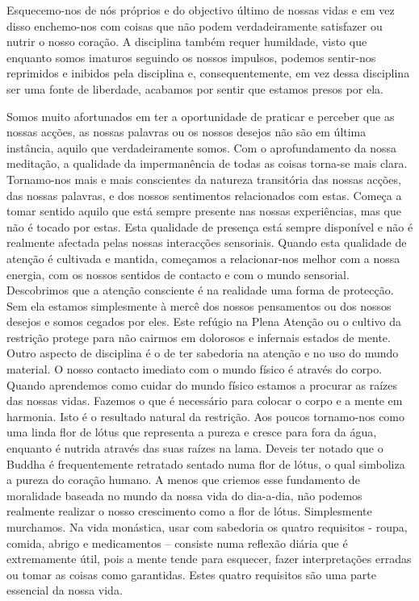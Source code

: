 Esquecemo-nos de nós próprios e do objectivo último de nossas vidas e em
vez disso enchemo-nos com coisas que não podem verdadeiramente
satisfazer ou nutrir o nosso coração. A disciplina também requer
humildade, visto que enquanto somos imaturos seguindo os nossos
impulsos, podemos sentir-nos reprimidos e inibidos pela disciplina e,
consequentemente, em vez dessa disciplina ser uma fonte de liberdade,
acabamos por sentir que estamos presos por ela.

Somos muito afortunados em ter a oportunidade de praticar e perceber que
as nossas acções, as nossas palavras ou os nossos desejos não são em
última instância, aquilo que verdadeiramente somos. Com o aprofundamento
da nossa meditação, a qualidade da impermanência de todas as coisas
torna-se mais clara. Tornamo-nos mais e mais conscientes da natureza
transitória das nossas acções, das nossas palavras, e dos nossos
sentimentos relacionados com estas. Começa a tomar sentido aquilo que
está sempre presente nas nossas experiências, mas que não é tocado por
estas. Esta qualidade de presença está sempre disponível e não é
realmente afectada pelas nossas interacções sensoriais. Quando esta
qualidade de atenção é cultivada e mantida, começamos a relacionar-nos
melhor com a nossa energia, com os nossos sentidos de contacto e com o
mundo sensorial. Descobrimos que a atenção consciente é na realidade uma
forma de protecção. Sem ela estamos simplesmente à mercê dos nossos
pensamentos ou dos nossos desejos e somos cegados por eles. Este refúgio
na Plena Atenção ou o cultivo da restrição protege para não cairmos em
dolorosos e infernais estados de mente. Outro aspecto de disciplina é o
de ter sabedoria na atenção e no uso do mundo material. O nosso contacto
imediato com o mundo físico é através do corpo. Quando aprendemos como
cuidar do mundo físico estamos a procurar as raízes das nossas vidas.
Fazemos o que é necessário para colocar o corpo e a mente em harmonia.
Isto é o resultado natural da restrição. Aos poucos tornamo-nos como uma
linda flor de lótus que representa a pureza e cresce para fora da água,
enquanto é nutrida através das suas raízes na lama. Deveis ter notado
que o Buddha é frequentemente retratado sentado numa flor de lótus, o
qual simboliza a pureza do coração humano. A menos que criemos esse
fundamento de moralidade baseada no mundo da nossa vida do dia-a-dia,
não podemos realmente realizar o nosso crescimento como a flor de lótus.
Simplesmente murchamos. Na vida monástica, usar com sabedoria os quatro
requisitos - roupa, comida, abrigo e medicamentos -- consiste numa
reflexão diária que é extremamente útil, pois a mente tende para
esquecer, fazer interpretações erradas ou tomar as coisas como
garantidas. Estes quatro requisitos são uma parte essencial da nossa
vida.

